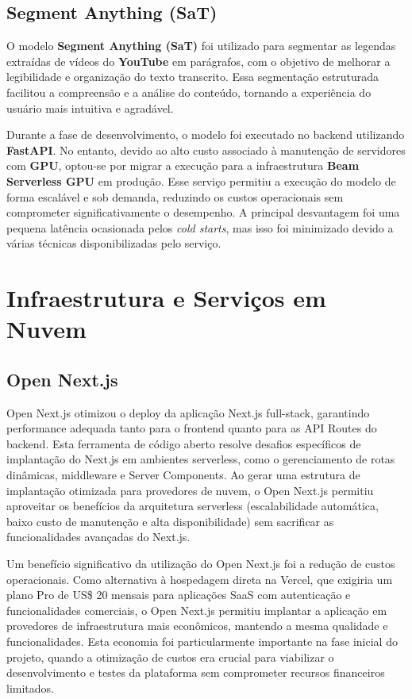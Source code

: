 \documentclass[tcc,capa]{texufpel}
\begin{document}
\subsection{Segment Anything (SaT)}

O modelo \textbf{Segment Anything (SaT)} foi utilizado para segmentar as legendas extraídas de vídeos do \textbf{YouTube} em parágrafos, com o objetivo de melhorar a legibilidade e organização do texto transcrito. Essa segmentação estruturada facilitou a compreensão e a análise do conteúdo, tornando a experiência do usuário mais intuitiva e agradável.

Durante a fase de desenvolvimento, o modelo foi executado no backend utilizando \textbf{FastAPI}. No entanto, devido ao alto custo associado à manutenção de servidores com \textbf{GPU}, optou-se por migrar a execução para a infraestrutura \textbf{Beam Serverless GPU} em produção. Esse serviço permitiu a execução do modelo de forma escalável e sob demanda, reduzindo os custos operacionais sem comprometer significativamente o desempenho. A principal desvantagem foi uma pequena latência ocasionada pelos \textit{cold starts}, mas isso foi minimizado devido a várias técnicas disponibilizadas pelo serviço.





\section{Infraestrutura e Serviços em Nuvem}

\subsection{Open Next.js}
Open Next.js otimizou o deploy da aplicação Next.js full-stack, garantindo performance adequada tanto para o frontend quanto para as API Routes do backend. Esta ferramenta de código aberto resolve desafios específicos de implantação do Next.js em ambientes serverless, como o gerenciamento de rotas dinâmicas, middleware e Server Components. Ao gerar uma estrutura de implantação otimizada para provedores de nuvem, o Open Next.js permitiu aproveitar os benefícios da arquitetura serverless (escalabilidade automática, baixo custo de manutenção e alta disponibilidade) sem sacrificar as funcionalidades avançadas do Next.js.

Um benefício significativo da utilização do Open Next.js foi a redução de custos operacionais. Como alternativa à hospedagem direta na Vercel, que exigiria um plano Pro de US\$ 20 mensais para aplicações SaaS com autenticação e funcionalidades comerciais, o Open Next.js permitiu implantar a aplicação em provedores de infraestrutura mais econômicos, mantendo a mesma qualidade e funcionalidades. Esta economia foi particularmente importante na fase inicial do projeto, quando a otimização de custos era crucial para viabilizar o desenvolvimento e testes da plataforma sem comprometer recursos financeiros limitados.
\end{document}
